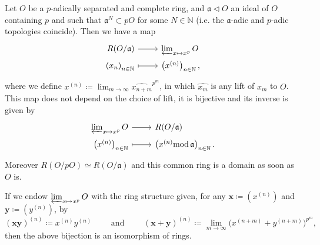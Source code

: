 \begin{prop}
	Let $O$ be a $p$-adically separated and complete ring, and $\mathfrak{a} \triangleleft O$
	an ideal of $O$ containing $p$ and such that $\mathfrak{a}^N \subset pO$ for some $N \in \mathbb{N}$
	(i.e. the $\mathfrak{a}$-adic and $p$-adic topologies coincide).
	Then we have a map
	\begin{equation*}
	\begin{tikzcd}[row sep = 0ex
		,/tikz/column 1/.append style={anchor=base east}
		,/tikz/column 2/.append style={anchor=base west}]
		R(O/\mathfrak{a}) \arrow[r, "", rightarrow] &
		\varprojlim_{x \mapsto x^p} O \\
		\left( x_n \right)_{n \in \mathbb{N}} \arrow[r, "", mapsto] & 
		\left( x^{(n)} \right)_{n \in \mathbb{N}}
	,\end{tikzcd}
	\end{equation*} 
	where we define $x^{(n)} \coloneqq \lim_{m \to \infty} \widehat{x_{n+m}}^{p^m}$,
	in which $\widehat{x_m}$ is any lift of $x_m$ to $O$.
	This map does not depend on the choice of lift, it is bijective
	and its inverse is given by
	\begin{equation*}
	\begin{tikzcd}[row sep = 0ex
		,/tikz/column 1/.append style={anchor=base east}
		,/tikz/column 2/.append style={anchor=base west}]
		\varprojlim_{x \mapsto x^p} O \arrow[r, "", rightarrow] &
		R(O/\mathfrak{a}) \\
		\left( x^{(n)} \right)_{n \in \mathbb{N}} \arrow[r, "", mapsto] & 
		\left( x^{(n)} \mathrm{mod}\, \mathfrak{a} \right)_{n \in \mathbb{N}}
	.\end{tikzcd}
	\end{equation*} 
	Moreover $R(O/pO) \simeq R(O/\mathfrak{a})$ and this common ring
	is a domain as soon as $O$ is.
\end{prop}


\begin{rem}[]
	If we endow $\varprojlim_{x \mapsto x^p} O$ with the ring structure
	given, for any $\mathbf{x} \coloneqq \left( x^{(n)} \right)$ and 
	$\mathbf{y} \coloneqq \left( y^{(n)} \right)$, 
	by
	\begin{equation*}
		\left( \mathbf{xy} \right)^{(n)} \coloneqq x^{(n)} y^{(n)}
		\qquad \text{ and } \qquad
		\left( \mathbf{x} + \mathbf{y} \right)^{(n)} \coloneqq
		\lim_{m \to \infty} \big( x^{(n+m)} +
		y^{(n+m)}\big)^{p^m}
	,\end{equation*}
	then the above bijection is an isomorphism of rings.
\end{rem}


